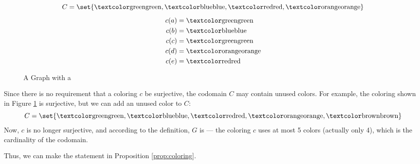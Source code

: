 \begin{figure}[h]
  \label{fig:exproper}
  \begin{minipage}[t]{3in}
    \begin{center}
      \vspace{0in}
    \end{center}
  \end{minipage}
  \begin{minipage}[t]{3in}
    \[C=\set{\mtxtclr{green},\mtxtclr{blue},\mtxtclr{red},\mtxtclr{orange}}\]
    \begin{align*}
      c(a) &= \mtxtclr{green} \\
      c(b) &= \mtxtclr{blue} \\
      c(c) &= \mtxtclr{green} \\
      c(d) &= \mtxtclr{orange} \\
      c(e) &= \mtxtclr{red}
    \end{align*}
  \end{minipage}
  \caption{A Graph with a }
\end{figure}

Since there is no requirement that a coloring \(c\) be surjective, the codomain \(C\) may contain unused colors.
For example, the coloring shown in Figure \ref{fig:exproper} is surjective, but we can add an unused color to
\(C\):
\[C=\set{\mtxtclr{green},\mtxtclr{blue},\mtxtclr{red},\mtxtclr{orange},\mtxtclr{brown}}\]
Now, \(c\) is no longer surjective, and according to the definition, \(G\) is  --- the coloring \(c\)
uses at most 5 colors (actually only 4), which is the cardinality of the codomain.

Thus, we can make the statement in Proposition \ref{prop:coloring}.

